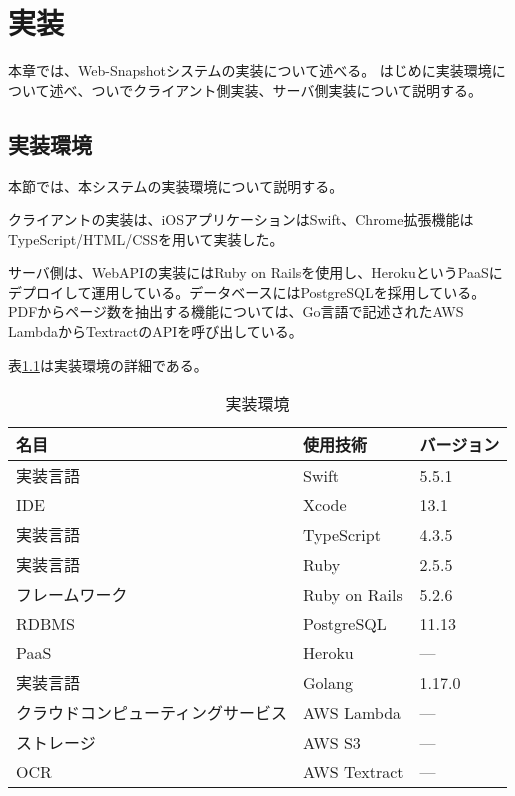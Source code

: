 \chapter{実装}
\label{chap:implementation}
本章では、Web-Snapshotシステムの実装について述べる。
はじめに実装環境について述べ、ついでクライアント側実装、サーバ側実装について説明する。

\section{実装環境}
本節では、本システムの実装環境について説明する。

クライアントの実装は、iOSアプリケーションはSwift、Chrome拡張機能はTypeScript/HTML/CSSを用いて実装した。

サーバ側は、WebAPIの実装にはRuby on Railsを使用し、Heroku\cite{heroku}というPaaSにデプロイして運用している。データベースにはPostgreSQLを採用している。
PDFからページ数を抽出する機能については、Go言語で記述されたAWS Lambda\cite{lambda}からTextract\cite{textract}のAPIを呼び出している。

表\ref{tb:implementation-env}は実装環境の詳細である。

\begin{table}[htbp]
  \label{tb:implementation-env}
  \caption{実装環境}
  \begin{center}
    \begin{tabular}{|l|l|l|}
    \hline
    名目 & 使用技術 & バージョン \\ \hline
    実装言語 & Swift & 5.5.1 \\ \hline
    IDE & Xcode & 13.1 \\ \hline
    実装言語 & TypeScript & 4.3.5 \\ \hline
    実装言語 & Ruby & 2.5.5 \\ \hline
    フレームワーク & Ruby on Rails & 5.2.6 \\ \hline
    RDBMS & PostgreSQL & 11.13 \\ \hline
    PaaS & Heroku & --- \\ \hline
    実装言語 & Golang & 1.17.0 \\ \hline
    クラウドコンピューティングサービス & AWS Lambda & --- \\ \hline
    ストレージ & AWS S3 & --- \\ \hline
    OCR & AWS Textract & --- \\ \hline
    \end{tabular}
  \end{center}
\end{table}




